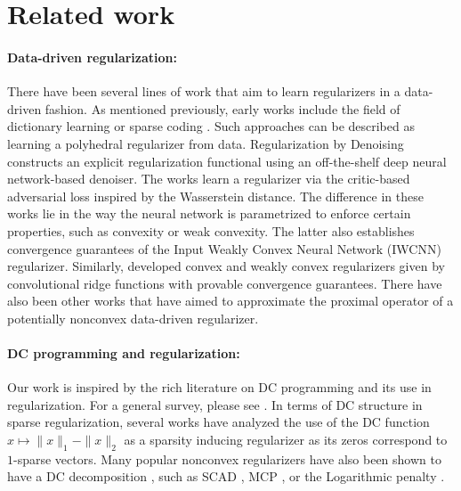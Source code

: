\section{Related work}
\paragraph{Data-driven regularization:} There have been several lines of work that aim to learn regularizers in a data-driven fashion. As mentioned previously, early works include the field of dictionary learning or sparse coding \cite{MairaletalSurvey14, EladSurvey10}. Such approaches can be described as learning a polyhedral regularizer from data. Regularization by Denoising \cite{romano2017RED} constructs an explicit regularization functional using an off-the-shelf deep neural network-based denoiser. The works \cite{lunz2018adversarial, acr, shumaylov2024weakly} learn a regularizer via the critic-based adversarial loss inspired by the Wasserstein distance. The difference in these works lie in the way the neural network is parametrized to enforce certain properties, such as convexity or weak convexity. The latter \cite{shumaylov2024weakly} also establishes convergence guarantees of the Input Weakly Convex Neural Network (IWCNN) regularizer. Similarly, \cite{goujon2023neural, goujon2024learning} developed convex and weakly convex regularizers given by convolutional ridge functions with provable convergence guarantees. There have also been other works \cite{Fanetal24} that have aimed to approximate the proximal operator of a potentially nonconvex data-driven regularizer.

\paragraph{DC programming and regularization:} Our work is inspired by the rich literature on DC programming and its use in regularization. For a general survey, please see \cite{le2018dc}. In terms of DC structure in sparse regularization, several works have analyzed the use of the DC function $x \mapsto \|x\|_1 - \|x\|_2$ as a sparsity inducing regularizer \cite{ahn2017difference, yin2015minimization} as its zeros correspond to $1$-sparse vectors. Many popular nonconvex regularizers have also been shown to have a DC decomposition \cite{cao2022unifying}, such as SCAD \cite{fan2001variable}, MCP \cite{zhang2010nearly}, or the Logarithmic penalty \cite{mazumder2011sparsenet}.